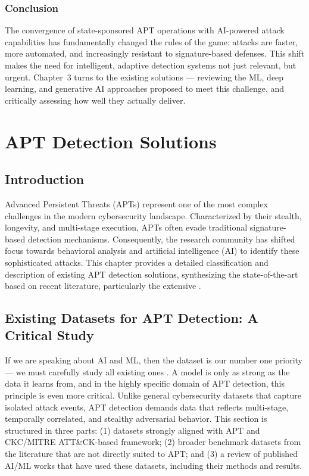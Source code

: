 \subsection{Conclusion}
The convergence of state-sponsored APT operations with AI-powered attack capabilities
has fundamentally changed the rules of the game: attacks are faster, more automated,
and increasingly resistant to signature-based defenses. This shift makes the need for
intelligent, adaptive detection systems not just relevant, but urgent. Chapter~3 turns
to the existing solutions --- reviewing the ML, deep learning, and generative AI
approaches proposed to meet this challenge, and critically assessing how well they
actually deliver.

\chapter{APT Detection Solutions}
\label{chap:apt_solutions}

\section{Introduction}

Advanced Persistent Threats (APTs) represent one of the most complex challenges in the modern cybersecurity landscape. Characterized by their stealth, longevity, and multi-stage execution, APTs often evade traditional signature-based detection mechanisms. Consequently, the research community has shifted focus towards behavioral analysis and artificial intelligence (AI) to identify these sophisticated attacks. This chapter provides a detailed classification and description of existing APT detection solutions, synthesizing the state-of-the-art based on recent literature, particularly the extensive \cite{ankalaki2025cyber}. 
\section{Existing Datasets for APT Detection: A Critical Study}

If we are speaking about AI and ML, then the dataset is our number one priority --- we must carefully study all existing ones . A model is only as strong as the data it learns from, and in the highly specific domain of APT detection, this principle is even more critical. Unlike general cybersecurity datasets that capture isolated attack events, APT detection demands data that reflects multi-stage, temporally correlated, and stealthy adversarial behavior. This section is structured in three parts: (1) datasets strongly aligned with APT and CKC/MITRE ATT\&CK-based framework; (2) broader benchmark datasets from the literature that are not directly suited to APT; and (3) a review of published AI/ML works that have used these datasets, including their methods and results.

